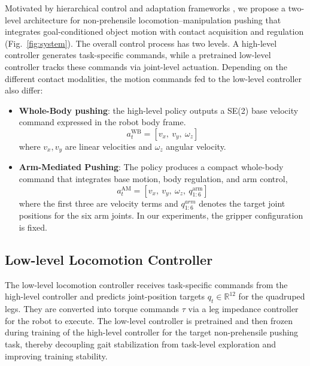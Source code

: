 Motivated by hierarchical control and adaptation frameworks \cite{Kumar2021RMA,2025relic}, we propose a two-level architecture for non-prehensile locomotion–manipulation pushing that integrates goal-conditioned object motion with contact acquisition and regulation (Fig.~\ref{fig:system}). The overall control process has two levels. A high-level controller generates task-specific commands, while a pretrained low-level controller tracks these commands via joint-level actuation. Depending on the different contact modalities, the motion commands fed to the low-level controller %
also differ: 
\begin{itemize}[leftmargin=*]
    \item \textbf{Whole-Body pushing}: the high-level policy outputs a SE(2) base velocity command expressed in the robot body frame. 
\begin{equation}
a_t^{\text{WB}} = [v_x,\ v_y,\ \omega_z] \label{eq:wb-command}
\end{equation}
where $v_x, v_y$ are linear velocities and $\omega_z$ angular velocity. 
\item \textbf{Arm-Mediated Pushing}: The policy produces a compact whole-body command that integrates base motion, body regulation, and arm control,
\begin{equation}
a_t^{\text{AM}} = \left[
v_x,\ v_y,\ \omega_z,\ q^{\text{arm}}_{1:6}
\right] \label{eq:am-command}
\end{equation}
where the first three are velocity terms and $q_{1:6}^{arm}$ denotes the target joint positions for the six arm joints. In our experiments, the gripper configuration is fixed.
\end{itemize} 


\subsection{Low-level Locomotion Controller}
The low-level locomotion controller receives task-specific commands from the high-level controller and predicts joint-position targets $q_t\in \mathbb{R}^{12}$ for the quadruped legs. They are converted into torque commands 
$\tau$ via a leg impedance controller for the robot to execute. The low-level controller is pretrained and then frozen during training of the high-level controller for the target non-prehensile pushing task, thereby decoupling gait stabilization from task-level exploration and improving training stability.

